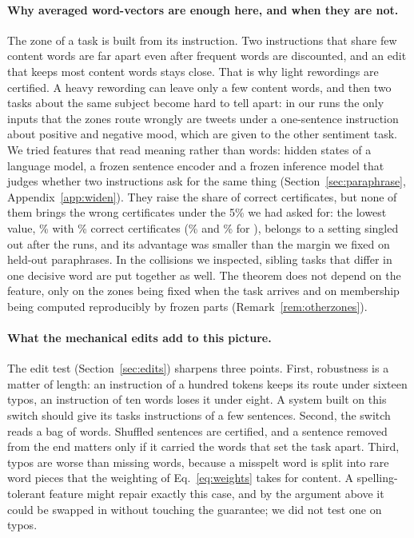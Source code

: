 \paragraph{Why averaged word-vectors are enough here, and when they are not.} The zone of a task is
built from its instruction. Two instructions that share few content words are far apart even after
frequent words are discounted, and an edit that keeps most content words stays close. That is why
light rewordings are certified. A heavy rewording can leave only a few content words, and then two
tasks about the same subject become hard to tell apart: in our runs the only inputs that the zones route wrongly
are tweets under a one-sentence instruction about positive and negative mood, which are given to
the other sentiment task. We tried features that read meaning rather than words: hidden states of a language model, a
frozen sentence encoder and a frozen inference model that judges whether two instructions ask for
the same thing (Section~\ref{sec:paraphrase}, Appendix~\ref{app:widen}). They raise the share of correct certificates, but none of them brings the wrong certificates under the 5\% we had asked for:
the lowest value, \WidenEncRulerTwentyFrM{}\% with \WidenEncRulerTwentyFrP{}\% correct certificates (\WidenRefTfiveFrM{}\% and \WidenRefTfiveFrP{}\% for \cert{}),
belongs to a setting singled out after the runs, and its advantage was smaller than the margin we fixed on held-out paraphrases. In the collisions we
inspected, sibling tasks that differ in one decisive word are put together as well. The theorem does not depend on the feature, only on the zones
being fixed when the task arrives and on membership being computed reproducibly by frozen parts (Remark~\ref{rem:otherzones}).

\paragraph{What the mechanical edits add to this picture.} The edit test (Section~\ref{sec:edits})
sharpens three points. First, robustness is a matter of length: an instruction of a hundred tokens
keeps its route under sixteen typos, an instruction of ten words loses it under eight. A system
built on this switch should give its tasks instructions of a few sentences. Second, the switch reads a bag of words. Shuffled
sentences are certified, and a sentence removed from the end matters only if it carried the words
that set the task apart. Third, typos are worse than missing words, because a misspelt word is
split into rare word pieces that the weighting of Eq.~\eqref{eq:weights} takes for content. A
spelling-tolerant feature might repair exactly this case, and by the argument above it could be
swapped in without touching the guarantee; we did not test one on typos.

